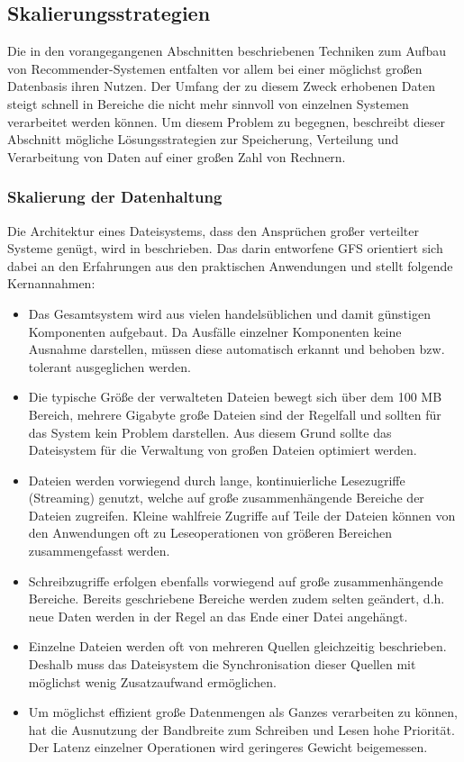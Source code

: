 \subsection{Skalierungsstrategien}
\label{sec:scale}

Die in den vorangegangenen Abschnitten beschriebenen Techniken zum Aufbau von Recommender-Systemen entfalten vor allem bei einer möglichst großen Datenbasis ihren Nutzen. Der Umfang der zu diesem Zweck erhobenen Daten steigt schnell in Bereiche die nicht mehr sinnvoll von einzelnen Systemen verarbeitet werden können.  Um  diesem Problem zu begegnen, beschreibt dieser Abschnitt mögliche Lösungsstrategien zur Speicherung, Verteilung und Verarbeitung von Daten auf einer großen Zahl von Rechnern. 

\subsubsection{Skalierung der Datenhaltung}\label{sec:hfs}

Die Architektur eines Dateisystems, dass den Ansprüchen großer verteilter Systeme genügt, wird in \citep{ghemawat03} beschrieben. Das darin entworfene \acf{GFS} orientiert sich dabei an den Erfahrungen aus den praktischen Anwendungen und stellt folgende Kernannahmen:

\begin{itemize}
\item Das Gesamtsystem wird aus vielen handelsüblichen und damit günstigen Komponenten aufgebaut. Da Ausfälle einzelner Komponenten keine Ausnahme darstellen, müssen diese automatisch erkannt und behoben bzw. tolerant ausgeglichen werden.
\item Die typische Größe der verwalteten Dateien bewegt sich über dem 100 MB Bereich, mehrere Gigabyte große Dateien sind der Regelfall und sollten für das System kein Problem darstellen. Aus diesem Grund sollte das Dateisystem für die Verwaltung von großen Dateien optimiert werden. 
\item Dateien werden vorwiegend durch lange, kontinuierliche Lesezugriffe (Streaming) genutzt, welche auf große zusammenhängende Bereiche der Dateien zugreifen. Kleine wahlfreie Zugriffe auf Teile der Dateien können von den Anwendungen oft zu Leseoperationen von größeren Bereichen zusammengefasst werden.
\item Schreibzugriffe erfolgen ebenfalls vorwiegend auf große zusammenhängende Bereiche. Bereits geschriebene Bereiche werden zudem selten geändert, d.h. neue Daten werden in der Regel an das Ende einer Datei angehängt.
\item Einzelne Dateien werden oft von mehreren Quellen gleichzeitig beschrieben. Deshalb muss das Dateisystem die Synchronisation dieser Quellen mit möglichst wenig Zusatzaufwand ermöglichen.
\item Um möglichst effizient große Datenmengen als Ganzes verarbeiten zu können, hat die Ausnutzung der Bandbreite zum Schreiben und Lesen hohe Priorität. Der Latenz einzelner Operationen wird geringeres Gewicht beigemessen.
\end{itemize}

